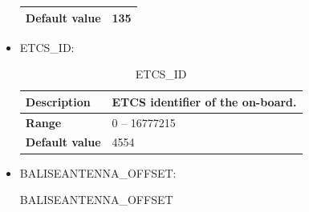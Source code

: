 \documentclass{template/openetcs}
\begin{document}
\begin{itemize}
\begin{longtable}{|l|l|}
					\begin{minipage}[t]{0.22\linewidth} \textbf{Default value}	\end{minipage} 
				&	\begin{minipage}[t]{0.78\linewidth} 135 \end{minipage} \\
				
				\hline
				
			\end{longtable}
			
		\item ETCS\_ID:
															
			\begin{longtable}{|l|l|}
				\caption{ETCS\_ID}\\ 
				\hline
				
					\begin{minipage}[t]{0.22\linewidth} \textbf{Description}	\end{minipage} 
				&	\begin{minipage}[t]{0.78\linewidth} ETCS identifier of the on-board. \end{minipage} \\
				
				\hline
																																									
					\begin{minipage}[t]{0.22\linewidth} \textbf{Range}	\end{minipage} 
				&	\begin{minipage}[t]{0.78\linewidth} 0 – 16777215 \end{minipage} \\
				
				\hline
				
					\begin{minipage}[t]{0.22\linewidth} \textbf{Default value}	\end{minipage} 
				&	\begin{minipage}[t]{0.78\linewidth} 4554 \end{minipage} \\
				
				\hline
				
			\end{longtable}
			
		\item BALISEANTENNA\_OFFSET:
																	
			\begin{longtable}{|l|l|}
				\caption{BALISEANTENNA\_OFFSET}\\ 
				\hline
				

\end{longtable}
\end{itemize}
\end{document}
